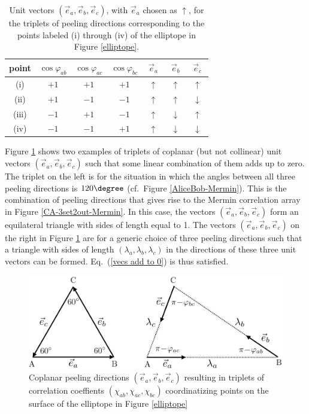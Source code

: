 \begin{table}[h]
\centering
\begin{tabular}{|c||c|c|c||c|c|c|}
\hline
$\!$point$\!$ & $\cos{\varphi_{ab}} $ & $\cos{\varphi_{ac}} $ & $\cos{\varphi_{bc}} $ & $\; \vec{e}_a \;$ & $\; \vec{e}_b \;$ & $\; \vec{e}_c \;$ \\[.1cm] 
\hline
 (i) & $+1$ & $+1$ & $+1$ & $\uparrow$ & $\uparrow$ & $\uparrow$ \\[.2cm]
 (ii) & $+1$ & $-1$ & $-1$ & $\uparrow$ & $\uparrow$ & $\downarrow$ \\[.2cm]
 (iii) & $-1$ & $+1$ & $-1$ & $\uparrow$ & $\downarrow$ & $\uparrow$ \\[.2cm]
(iv) & $-1$ & $-1$ & $+1$ & $\uparrow$ & $\downarrow$ & $\downarrow$ \\
 \hline
\end{tabular}
\caption{Unit vectors $(\vec{e}_a, \vec{e}_b, \vec{e}_c)$, with $\vec{e}_a$ chosen as $\uparrow$, for the triplets of peeling directions corresponding to the points labeled (i) through (iv) of the elliptope in Figure \ref{elliptope}.}
\label{collinear peeling directions}
\end{table} 

Figure \ref{vectors4elliptope} shows two examples of triplets of coplanar (but not collinear) unit vectors $(\vec{e}_a, \vec{e}_b, \vec{e}_c)$ such that some linear combination of them adds up to zero. The triplet on the left is for the situation in which the angles between all three peeling directions is $120\degree$ (cf.\ Figure \ref{AliceBob-Mermin}). This is the combination of peeling directions that gives rise to the Mermin correlation array in Figure \ref{CA-3set2out-Mermin}. In this case, the vectors $(\vec{e}_a, \vec{e}_b, \vec{e}_c)$ form an equilateral triangle with sides of length equal to 1. The vectors $(\vec{e}_a, \vec{e}_b, \vec{e}_c)$ on the right in Figure \ref{vectors4elliptope} are for a generic choice of three peeling directions such that a triangle with sides of length $(\lambda_a, \lambda_b, \lambda_c)$ in the directions of these three unit vectors can be formed. Eq.\ (\ref{vecs add to 0}) is thus satisfied. 

\begin{figure}[h!]
 \centering
   \includegraphics[width=4.5in]{vectors4elliptope.jpeg} 
   \caption{Coplanar peeling directions $(\vec{e}_a, \vec{e}_b, \vec{e}_c)$ resulting in triplets of correlation coeffients $(\chi_{ab}, \chi_{ac}, \chi_{bc})$ coordinatizing points on the surface of the elliptope in Figure \ref{elliptope}}
   \label{vectors4elliptope}
\end{figure}

